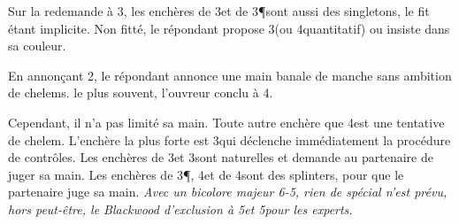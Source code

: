 Sur la redemande à 3\K, les enchères de 3\C et de 3\P sont aussi des singletons, le fit \K étant implicite. Non fitté, le répondant propose 3\NT (ou 4\NT quantitatif) ou insiste dans sa couleur.


\titre{1\T--2\NT}

En annonçant 2\NT, le répondant annonce une main banale de manche sans ambition de chelems. le plus souvent, l'ouvreur conclu à 4\C.

Cependant, il n'a pas limité sa main. Toute autre enchère que 4\C est une tentative de chelem. L'enchère la plus forte est 3\C qui déclenche immédiatement la procédure de contrôles. Les enchères de 3\T et 3\K sont naturelles et demande au partenaire de juger sa main. Les enchères de
3\P, 4\T et de 4\K sont des splinters, pour que le partenaire juge sa main. \textit{Avec un bicolore majeur 6-5, rien de spécial n'est prévu, hors peut-être, le Blackwood d'exclusion à 5\T et 5\K pour les experts.}
